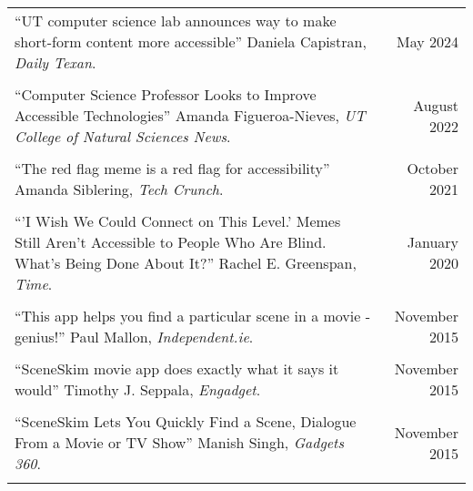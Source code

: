 \begin{longtable}{Xr}
	``UT computer science lab announces way to make short-form content more accessible'' Daniela Capistran, \textit{Daily Texan}. & May 2024 \\
	\\

	``Computer Science Professor Looks to Improve Accessible Technologies'' Amanda Figueroa-Nieves, \textit{UT College of Natural Sciences News}. & August 2022 \\
	\\

	``The red flag meme is a red flag for accessibility'' Amanda Siblering, \textit{Tech Crunch}. & October 2021 \\
	\\

	``'I Wish We Could Connect on This Level.' Memes Still Aren't Accessible to People Who Are Blind. What's Being Done About It?'' Rachel E. Greenspan, \textit{Time}. & January 2020 \\
	\\

	``This app helps you find a particular scene in a movie - genius!'' Paul Mallon, \textit{Independent.ie}. & November 2015 \\
	\\

	``SceneSkim movie app does exactly what it says it would'' Timothy J. Seppala, \textit{Engadget}. & November 2015 \\
	\\

	``SceneSkim Lets You Quickly Find a Scene, Dialogue From a Movie or TV Show'' Manish Singh, \textit{Gadgets 360}. & November 2015 \\
	\\

\end{longtable}
